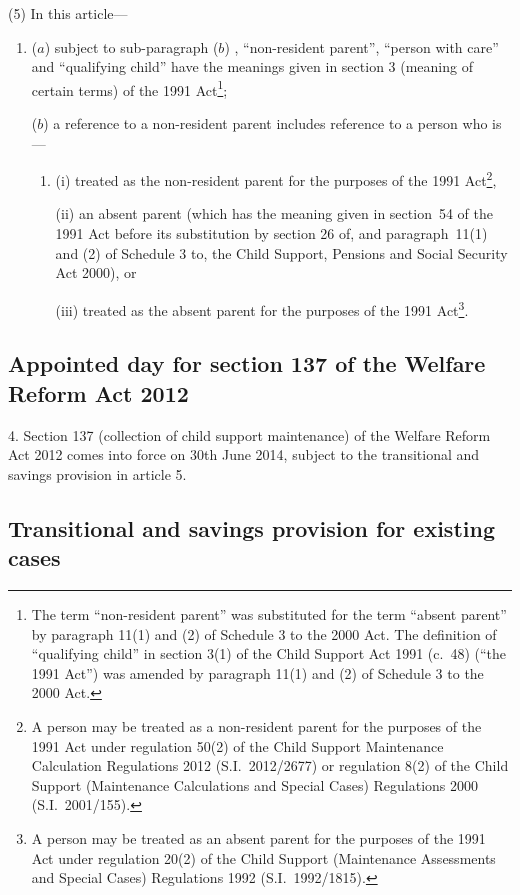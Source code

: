 \documentclass[12pt,a4paper]{article}
\begin{document}
(5) In this article—
\begin{enumerate}\item[]
($a$) subject to sub-paragraph ($b$) , “non-resident parent”, “person with care” and “qualifying child” have the meanings given in section 3 (meaning of certain terms) of the 1991 Act\footnote{The term “non-resident parent” was substituted for the term “absent parent” by paragraph 11(1) and (2) of Schedule 3 to the 2000 Act. The definition of “qualifying child” in section 3(1) of the Child Support Act 1991 (c.~48) (“the 1991 Act”) was amended by paragraph 11(1) and (2) of Schedule 3 to the 2000 Act.};

($b$) a reference to a non-resident parent includes reference to a person who is—
\begin{enumerate}\item[]
(i) treated as the non-resident parent for the purposes of the 1991 Act\footnote{A person may be treated as a non-resident parent for the purposes of the 1991 Act under regulation 50(2) of the Child Support Maintenance Calculation Regulations 2012 (S.I.~2012/2677) or regulation 8(2) of the Child Support (Maintenance Calculations and Special Cases) Regulations 2000 (S.I.~2001/155).},

(ii) an absent parent (which has the meaning given in section~54 of the 1991 Act before its substitution by section 26 of, and paragraph~11(1) and (2) of Schedule 3 to, the Child Support, Pensions and Social Security Act 2000), or

(iii) treated as the absent parent for the purposes of the 1991 Act\footnote{A person may be treated as an absent parent for the purposes of the 1991 Act under regulation 20(2) of the Child Support (Maintenance Assessments and Special Cases) Regulations 1992 (S.I.~1992/1815).}.
\end{enumerate}
\end{enumerate}

\subsection[4. Appointed day for section 137 of the Welfare Reform Act 2012]{Appointed day for section 137 of the Welfare Reform Act 2012}

4.  Section 137 (collection of child support maintenance) of the Welfare Reform Act 2012 comes into force on 30th June 2014, subject to the transitional and savings provision in article 5.

\subsection[5. Transitional and savings provision for existing cases]{Transitional and savings provision for existing cases}
\end{document}
